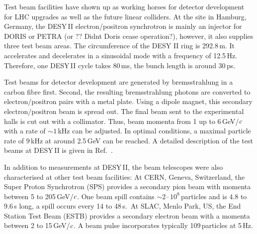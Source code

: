 Test beam facilities have shown up as working horses for detector development for LHC upgrades as well as the future linear colliders.
At the site in Hamburg, Germany, the DESY\,II electron/positron synchrotron is mainly an injector for DORIS or PETRA (or ?? Didnt Doris cease operation?), however, it also supplies three test beam areas. 
The circumference of the DESY II ring is 292.8\,m. 
It accelerates and decelerates in a sinusoidal mode with a frequency of 12.5\,Hz. 
Therefore, one DESY\,II cycle takes 80\,ms, the bunch length is around 30\,ps. 

Test beams for detector development are generated by bremsstrahlung in a carbon fibre first. 
Second, the resulting bremsstrahlung photons are converted to electron/positron pairs with a metal plate. 
Using a dipole magnet, this secondary electron/positron beam is spread out.
The final beam sent to the experimental halls is cut out with a collimator. 
Thus, beam momenta from 1 up to 6\,GeV/$\mathnormal{c}$ with a rate of $\sim 1$\,kHz can be adjusted. 
In optimal conditions, a maximal particle rate of $9$\,kHz at around 2.5\,GeV can be reached. 
A detailed description of the test beams at DESY\,II is given in Ref.~\cite{EUDET-2007-11}.

In addition to measurements at DESY\,II, the beam telescopes were also characterised at other test beam facilities: 
At CERN, Geneva, Switzerland, the Super Proton Synchrotron (SPS) provides a secondary pion beam with momenta between 5 to 205\,GeV/$\mathnormal{c}$. 
One beam spill contains $\sim 2\cdot10^8$\,particles and is 4.8 to 9.6\,s long, a spill occurs every 14 to 48\,s.\,\cite{???} 
At SLAC, Menlo Park, US, the End Station Test Beam (ESTB) provides a secondary electron beam with a momenta between 2 to 15\,GeV/$\mathnormal{c}$.
A beam pulse incorporates typically 109\,particles at 5\,Hz.\,\cite{d}






